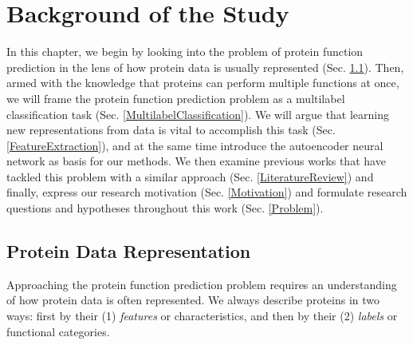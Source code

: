 %
%
%
%
%

\chapter{Background of the Study}
\label{BackgroundChapter}

\par In this chapter, we begin by looking into the problem of protein
function prediction in the lens of how protein data is usually represented
(Sec. \ref{ProteinFunctionPrediction}). Then, armed with the knowledge that
proteins can perform multiple functions at once, we will frame the protein
function prediction problem as a multilabel classification task (Sec.
\ref{MultilabelClassification}). We will argue that learning new
representations from data is vital to accomplish this task (Sec.
\ref{FeatureExtraction}), and at the same time introduce the autoencoder
neural network as basis for our methods. We then examine
previous works that have tackled this problem with a similar approach (Sec.
\ref{LiteratureReview}) and finally, express our research motivation
(Sec. \ref{Motivation}) and formulate research questions and hypotheses
throughout this work (Sec. \ref{Problem}).


\section{Protein Data Representation}
\label{ProteinFunctionPrediction}

Approaching the protein function prediction problem requires an
understanding of how protein data is often represented. We always
describe proteins in two ways: first by their (1) \textit{features} or
characteristics, and then by their (2) \textit{labels} or functional
categories.

